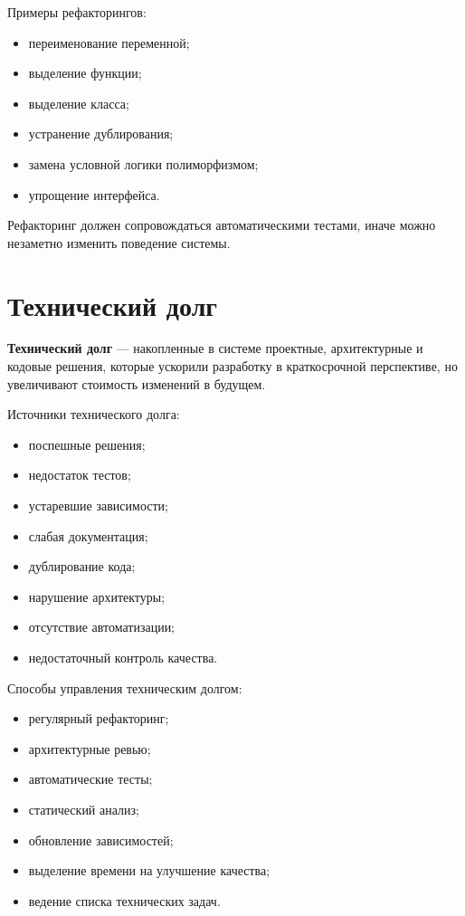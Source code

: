 \documentclass[12pt,a4paper]{article}
\begin{document}
Примеры рефакторингов:
\begin{itemize}
    \item переименование переменной;
    \item выделение функции;
    \item выделение класса;
    \item устранение дублирования;
    \item замена условной логики полиморфизмом;
    \item упрощение интерфейса.
\end{itemize}

Рефакторинг должен сопровождаться автоматическими тестами, иначе можно незаметно изменить поведение системы.

\section{Технический долг}

\textbf{Технический долг} --- накопленные в системе проектные, архитектурные и кодовые решения, которые ускорили разработку в краткосрочной перспективе, но увеличивают стоимость изменений в будущем.

Источники технического долга:
\begin{itemize}
    \item поспешные решения;
    \item недостаток тестов;
    \item устаревшие зависимости;
    \item слабая документация;
    \item дублирование кода;
    \item нарушение архитектуры;
    \item отсутствие автоматизации;
    \item недостаточный контроль качества.
\end{itemize}

Способы управления техническим долгом:
\begin{itemize}
    \item регулярный рефакторинг;
    \item архитектурные ревью;
    \item автоматические тесты;
    \item статический анализ;
    \item обновление зависимостей;
    \item выделение времени на улучшение качества;
    \item ведение списка технических задач.
\end{itemize}
\end{document}
